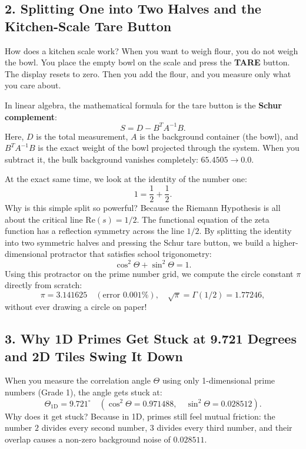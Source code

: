 \documentclass[11pt,a4paper]{article}
\theoremstyle{definition}
\begin{document}
\subsection{2. Splitting One into Two Halves and the Kitchen-Scale Tare Button}
How does a kitchen scale work? When you want to weigh flour, you do not weigh the bowl. You place the empty bowl on the scale and press the \textbf{TARE} button. The display resets to zero. Then you add the flour, and you measure only what you care about.

In linear algebra, the mathematical formula for the tare button is the \textbf{Schur complement}:
\begin{equation}
S = D - B^T A^{-1} B.
\end{equation}
Here, $D$ is the total measurement, $A$ is the background container (the bowl), and $B^T A^{-1} B$ is the exact weight of the bowl projected through the system. When you subtract it, the bulk background vanishes completely: $65.4505 \to 0.0$.

At the exact same time, we look at the identity of the number one:
\begin{equation}
1 = \frac{1}{2} + \frac{1}{2}.
\end{equation}
Why is this simple split so powerful? Because the Riemann Hypothesis is all about the critical line $\mathrm{Re}(s) = 1/2$. The functional equation of the zeta function has a reflection symmetry across the line $1/2$. By splitting the identity into two symmetric halves and pressing the Schur tare button, we build a higher-dimensional protractor that satisfies school trigonometry:
\begin{equation}
\cos^2\Theta + \sin^2\Theta = 1.
\end{equation}
Using this protractor on the prime number grid, we compute the circle constant $\pi$ directly from scratch:
\begin{equation}
\pi = 3.141625 \quad (\text{error } 0.001\%), \quad \sqrt{\pi} = \Gamma(1/2) = 1.77246,
\end{equation}
without ever drawing a circle on paper!

\subsection{3. Why 1D Primes Get Stuck at 9.721 Degrees and 2D Tiles Swing It Down}
When you measure the correlation angle $\Theta$ using only 1-dimensional prime numbers (Grade 1), the angle gets stuck at:
\begin{equation}
\Theta_{\text{1D}} = 9.721^\circ \quad (\cos^2\Theta = 0.971488, \quad \sin^2\Theta = 0.028512).
\end{equation}
Why does it get stuck? Because in 1D, primes still feel mutual friction: the number $2$ divides every second number, $3$ divides every third number, and their overlap causes a non-zero background noise of $0.028511$.
\end{document}
